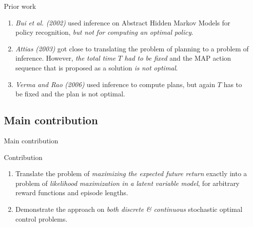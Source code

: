 \documentclass[]{beamer}
\theoremstyle{definition}
\begin{document}
\begin{frame}{Prior work}
    \begin{enumerate}
        \item \emph{Bui et al. (2002)} used inference on Abstract Hidden Markov Models for policy recognition, \emph{but not for computing an optimal policy}.
        \item \emph{Attias (2003)} got close to translating the problem of planning to a problem of inference. However, \emph{the total time $T$ had to be fixed} and the MAP action sequence that is proposed as a solution \emph{is not optimal}.
        \item \emph{Verma and Rao (2006)} used inference to compute plans, but again $T$ has to be fixed and the plan is not optimal.
    \end{enumerate}
    

\end{frame}

\subsection{Main contribution}
\begin{frame}{Main contribution}
	\begin{alertblock}{Contribution}
		\begin{enumerate}[<+-|alert@+>]
			\item Translate the problem of \emph{maximizing the expected future return} exactly into a problem of \emph{likelihood maximization in a latent variable model}, for arbitrary reward functions and episode lengths.
			\item Demonstrate the approach on \emph{both discrete \& continuous} stochastic optimal control problems.
		\end{enumerate}
	\end{alertblock}
\end{frame}
\end{document}

